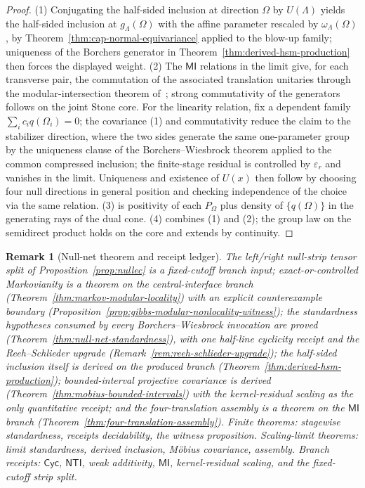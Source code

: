 \documentclass[11pt]{article}
\newtheorem{remark}[theorem]{Remark}
\begin{document}
\begin{proof}
(1) Conjugating the half-sided inclusion at direction \(\Omega\) by
\(U(\Lambda)\) yields the half-sided inclusion at \(g_\Lambda(\Omega)\) with
the affine parameter rescaled by \(\omega_\Lambda(\Omega)\), by
Theorem~\ref{thm:cap-normal-equivariance} applied to the blow-up family;
uniqueness of the Borchers generator in
Theorem~\ref{thm:derived-hsm-production} then forces the displayed weight.
(2) The \(\mathsf{MI}\) relations in the limit give, for each transverse pair,
the commutation of the associated translation unitaries through the
modular-intersection theorem of~\cite{wiesbrock98}; strong commutativity of
the generators follows on the joint Stone core. For the linearity relation,
fix a dependent family \(\sum_ic_iq(\Omega_i)=0\); the covariance (1) and
commutativity reduce the claim to the stabilizer direction, where the two
sides generate the same one-parameter group by the uniqueness clause of the
Borchers--Wiesbrock theorem applied to the common compressed inclusion; the
finite-stage residual is controlled by \(\varepsilon_r\) and vanishes in the
limit. Uniqueness and existence of \(U(x)\) then follow by choosing four
null directions in general position and checking independence of the choice
via the same relation. (3) is positivity of each \(P_\Omega\) plus density of
\(\{q(\Omega)\}\) in the generating rays of the dual cone. (4) combines (1)
and (2); the group law on the semidirect product holds on the core and
extends by continuity.
\end{proof}

\begin{remark}[Null-net theorem and receipt ledger]
\label{rem:null-net-status}
The left/right null-strip tensor split of Proposition~\ref{prop:nullec} is a
fixed-cutoff branch input;
exact-or-controlled Markovianity is a theorem on the
central-interface branch (Theorem~\ref{thm:markov-modular-locality}) with an
explicit counterexample boundary
(Proposition~\ref{prop:gibbs-modular-nonlocality-witness}); the standardness
hypotheses consumed by every Borchers--Wiesbrock invocation are proved
(Theorem~\ref{thm:null-net-standardness}), with one half-line cyclicity
receipt and the Reeh--Schlieder upgrade
(Remark~\ref{rem:reeh-schlieder-upgrade}); the half-sided inclusion itself is
derived on the produced branch (Theorem~\ref{thm:derived-hsm-production});
bounded-interval projective covariance is derived
(Theorem~\ref{thm:mobius-bounded-intervals}) with the kernel-residual scaling
as the only quantitative receipt; and the four-translation assembly is a
theorem on the \(\mathsf{MI}\) branch
(Theorem~\ref{thm:four-translation-assembly}). Finite theorems: stagewise
standardness, receipts decidability, the witness proposition. Scaling-limit
theorems: limit standardness, derived inclusion, M\"obius covariance,
assembly. Branch receipts: \(\mathsf{Cyc}\), \(\mathsf{NTI}\), weak
additivity, \(\mathsf{MI}\), kernel-residual scaling, and the fixed-cutoff
strip split.
\end{remark}
\end{document}
